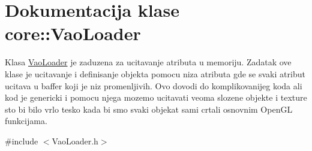 \hypertarget{classcore_1_1VaoLoader}{}\section{Dokumentacija klase core\+:\+:Vao\+Loader}
\label{classcore_1_1VaoLoader}


Klasa \hyperlink{classcore_1_1VaoLoader}{Vao\+Loader} je zaduzena za ucitavanje atributa u memoriju. Zadatak ove klase je ucitavanje i definisanje objekta pomocu niza atributa gde se svaki atribut ucitava u baffer koji je niz promenljivih. Ovo dovodi do komplikovanijeg koda ali kod je genericki i pomocu njega mozemo ucitavati veoma slozene objekte i texture sto bi bilo vrlo tesko kada bi smo svaki objekat sami crtali osnovnim Open\+GL funkcijama.  




{\ttfamily \#include $<$Vao\+Loader.\+h$>$}

